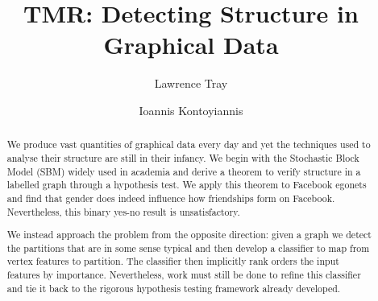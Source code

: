 \documentclass[]{article}
\title{TMR: Detecting Structure in Graphical Data}
\author{Lawrence Tray \and Ioannis Kontoyiannis}
\begin{document}
\maketitle

\begin{abstract}
We produce vast quantities of graphical data every day and yet the techniques used to analyse their structure are still in their infancy. We begin with the Stochastic Block Model (SBM) widely used in academia and derive a theorem to verify structure in a labelled graph through a hypothesis test. We apply this theorem to Facebook egonets and find that gender does indeed influence how friendships form on Facebook. Nevertheless, this binary yes-no result is unsatisfactory.

We instead approach the problem from the opposite direction: given a graph we detect the partitions that are in some sense typical and then develop a classifier to map from vertex features to partition. The classifier then implicitly rank orders the input features by importance. Nevertheless, work must still be done to refine this classifier and tie it back to the rigorous hypothesis testing framework already developed.
\end{abstract}
\end{document}

